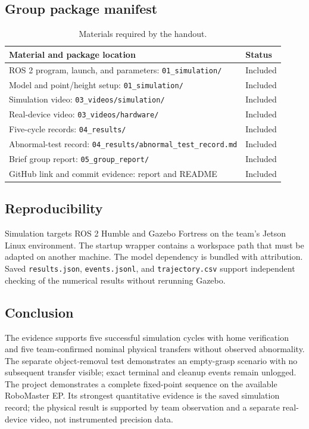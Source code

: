 \documentclass[9pt,a4paper,twocolumn,twoside]{tau-class/tau}
\newcommand{\codepath}[1]{{\small\ttfamily\nolinkurl{#1}}}
\begin{document}
\subsection{Group package manifest}
\begin{table}[H]
\caption{Materials required by the handout.}
\label{tab:manifest}
\begin{tabularx}{\columnwidth}{@{}Yp{14mm}@{}}
\toprule
\textbf{Material and package location} & \textbf{Status}\\
\midrule
ROS 2 program, launch, and parameters: \codepath{01_simulation/} & Included\\
Model and point/height setup: \codepath{01_simulation/} & Included\\
Simulation video: \codepath{03_videos/simulation/} & Included\\
Real-device video: \codepath{03_videos/hardware/} & Included\\
Five-cycle records: \codepath{04_results/} & Included\\
Abnormal-test record: \codepath{04_results/abnormal_test_record.md} & Included\\
Brief group report: \codepath{05_group_report/} & Included\\
GitHub link and commit evidence: report and README & Included\\
\bottomrule
\end{tabularx}
\end{table}

\subsection{Reproducibility}
Simulation targets ROS 2 Humble and Gazebo Fortress on the team's Jetson Linux
environment. The startup wrapper contains a workspace path that must be adapted
on another machine. The model dependency is bundled with attribution. Saved
\codepath{results.json}, \codepath{events.jsonl}, and
\codepath{trajectory.csv} support independent checking of the numerical results
without rerunning Gazebo.

\subsection{Conclusion}
The evidence supports five successful simulation cycles with home verification
and five team-confirmed nominal physical transfers without observed abnormality.
The separate object-removal test demonstrates an empty-grasp scenario with no
subsequent transfer visible; exact terminal and cleanup events remain unlogged. The
project demonstrates a complete fixed-point sequence on the available RoboMaster
EP. Its strongest quantitative evidence is the saved simulation record; the
physical result is supported by team observation and a separate real-device
video, not instrumented precision data.
\end{document}

